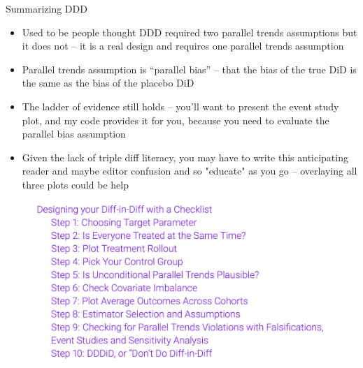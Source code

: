 \documentclass{beamer}
\begin{document}
\begin{frame}{Summarizing DDD}

\begin{itemize}
\item Used to be people thought DDD required two parallel trends assumptions but it does not -- it is a real design and requires one parallel trends assumption
\item Parallel trends assumption is ``parallel bias'' -- that the bias of the true DiD is the same as the bias of the placebo DiD
\item The ladder of evidence still holds -- you'll want to present the event study plot, and my code provides it for you, because you need to evaluate the parallel bias assumption
\item Given the lack of triple diff literacy, you may have to write this anticipating reader and maybe editor confusion and so "educate" as you go -- overlaying all three plots could be help

\end{itemize}

\end{frame}



\begin{frame}
 
\begin{figure}
    \centering
    \includegraphics[width=\textwidth]{./lecture_includes/checklist}
\end{figure}

\end{frame}
\end{document}
